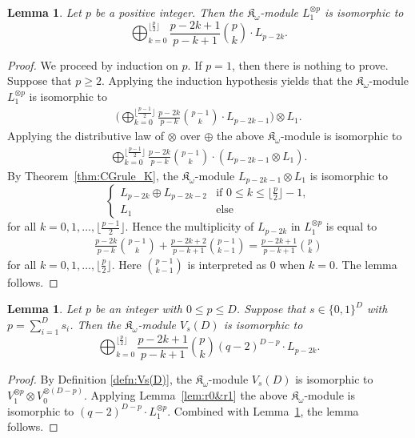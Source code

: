 \documentclass[10pt,a4paper]{amsart}
\def\K{\mathfrak K_\omega}
\numberwithin{equation}{section}
\newtheorem{Lemma}[Theorem]{Lemma}
\begin{document}
\begin{Lemma}\label{lem:K1p}
Let $p$ be a positive integer. Then the $\K$-module $L_1^{\otimes p}$ is isomorphic to
\[
\bigoplus_{k=0}^{\lfloor\frac{p}{2}\rfloor}
\frac{p-2k+1}{p-k+1}{p\choose k}\cdot L_{p-2k}.
\]
\end{Lemma}
\begin{proof}
We proceed by induction on $p$. If $p=1$, then there is nothing to prove. Suppose that $p\geq 2$. Applying the induction hypothesis yields that the $\K$-module $L_1^{\otimes p}$ is isomorphic to
\begin{align*}
\bigg(\bigoplus_{k=0}^{\lfloor \frac{p-1}{2}\rfloor}
\frac{p-2k}{p-k}{p-1\choose k}\cdot L_{p-2k-1}\bigg)\otimes L_1.
\end{align*}
Applying the distributive law of $\otimes$ over $\oplus$ the above $\K$-module is isomorphic to
\begin{align*}
\bigoplus_{k=0}^{\lfloor \frac{p-1}{2}\rfloor}
\frac{p-2k}{p-k}{p-1\choose k} \cdot(L_{p-2k-1}\otimes L_1).
\end{align*}
By Theorem~\ref{thm:CGrule_K}, the $\K$-module $L_{p-2k-1}\otimes L_1$ is isomorphic to
\[
\begin{cases}
L_{p-2k}\oplus L_{p-2k-2}
&\text{if $0\leq k\leq \big\lfloor \frac{p}{2} \big\rfloor-1$},
\\
L_1&\text{else}
\end{cases}
\]
for all $k=0,1,\dots,\big\lfloor \frac{p-1}{2}\big\rfloor$. Hence the multiplicity of $L_{p-2k}$ in $L_1^{\otimes p}$ is equal to
\begin{gather*}
\frac{p-2k}{p-k}{p-1\choose k}+\frac{p-2k+2}{p-k+1}{p-1\choose k-1}=\frac{p-2k+1}{p-k+1}{p\choose k}
\end{gather*}
for all $k=0,1,\dots,\big\lfloor\frac{p}{2}\big\rfloor$. Here ${p-1 \choose k-1}$ is interpreted as $0$ when $k=0$.
The lemma follows.
\end{proof}



\begin{Lemma}\label{lem:dec_Vs(D)}
Let $p$ be an integer with $0\leq p\leq D$.
Suppose that $s\in \{0,1\}^D$ with $p=\sum_{i=1}^D s_i$. Then the $\K$-module $V_s(D)$ is isomorphic to
\[
\bigoplus_{k=0}^{\lfloor \frac{p}{2} \rfloor}
\frac{p-2k+1}{p-k+1}{p\choose k}
(q-2)^{D-p}\cdot L_{p-2k}.
\]
\end{Lemma}

\begin{proof}
By Definition \ref{defn:Vs(D)}, the $\K$-module $V_s(D)$ is isomorphic to
$V_1^{\otimes p}\otimes V_0^{\otimes (D-p)}$.
Applying Lemma~\ref{lem:r0&r1} the above $\K$-module is isomorphic to
$(q-2)^{D-p}\cdot L_1^{\otimes p}$.
Combined with Lemma~\ref{lem:K1p}, the lemma follows.
\end{proof}
\end{document}
